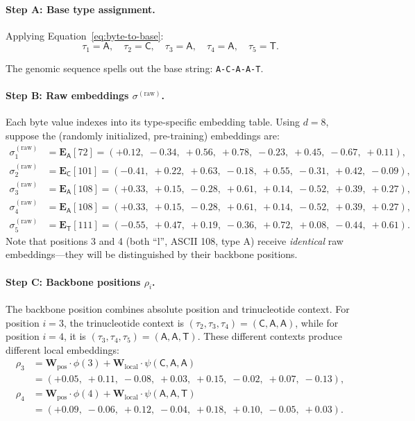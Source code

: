 \paragraph{Step A: Base type assignment.} Applying Equation~\ref{eq:byte-to-base}:
\[
\tau_1 = \mathsf{A}, \quad \tau_2 = \mathsf{C}, \quad \tau_3 = \mathsf{A}, \quad \tau_4 = \mathsf{A}, \quad \tau_5 = \mathsf{T}.
\]

The genomic sequence spells out the base string: \texttt{A-C-A-A-T}.

\paragraph{Step B: Raw embeddings $\sigma^{(\text{raw})}$.} Each byte value indexes into its type-specific embedding table. Using $d = 8$, suppose the (randomly initialized, pre-training) embeddings are:
\begin{align*}
\sigma_1^{(\text{raw})} &= \mathbf{E}_{\mathsf{A}}[72] = (+0.12,\; -0.34,\; +0.56,\; +0.78,\; -0.23,\; +0.45,\; -0.67,\; +0.11), \\
\sigma_2^{(\text{raw})} &= \mathbf{E}_{\mathsf{C}}[101] = (-0.41,\; +0.22,\; +0.63,\; -0.18,\; +0.55,\; -0.31,\; +0.42,\; -0.09), \\
\sigma_3^{(\text{raw})} &= \mathbf{E}_{\mathsf{A}}[108] = (+0.33,\; +0.15,\; -0.28,\; +0.61,\; +0.14,\; -0.52,\; +0.39,\; +0.27), \\
\sigma_4^{(\text{raw})} &= \mathbf{E}_{\mathsf{A}}[108] = (+0.33,\; +0.15,\; -0.28,\; +0.61,\; +0.14,\; -0.52,\; +0.39,\; +0.27), \\
\sigma_5^{(\text{raw})} &= \mathbf{E}_{\mathsf{T}}[111] = (-0.55,\; +0.47,\; +0.19,\; -0.36,\; +0.72,\; +0.08,\; -0.44,\; +0.61).
\end{align*}
Note that positions 3 and 4 (both ``l'', ASCII 108, type A) receive \emph{identical} raw embeddings---they will be distinguished by their backbone positions.

\paragraph{Step C: Backbone positions $\rho_i$.} The backbone position combines absolute position and trinucleotide context. For position $i=3$, the trinucleotide context is $(\tau_2, \tau_3, \tau_4) = (\mathsf{C}, \mathsf{A}, \mathsf{A})$, while for position $i=4$, it is $(\tau_3, \tau_4, \tau_5) = (\mathsf{A}, \mathsf{A}, \mathsf{T})$. These different contexts produce different local embeddings:
\begin{align*}
\rho_3 &= \mathbf{W}_{\text{pos}} \cdot \phi(3) + \mathbf{W}_{\text{local}} \cdot \psi(\mathsf{C}, \mathsf{A}, \mathsf{A}) \\
       &= (+0.05,\; +0.11,\; -0.08,\; +0.03,\; +0.15,\; -0.02,\; +0.07,\; -0.13), \\
\rho_4 &= \mathbf{W}_{\text{pos}} \cdot \phi(4) + \mathbf{W}_{\text{local}} \cdot \psi(\mathsf{A}, \mathsf{A}, \mathsf{T}) \\
       &= (+0.09,\; -0.06,\; +0.12,\; -0.04,\; +0.18,\; +0.10,\; -0.05,\; +0.03).
\end{align*}

